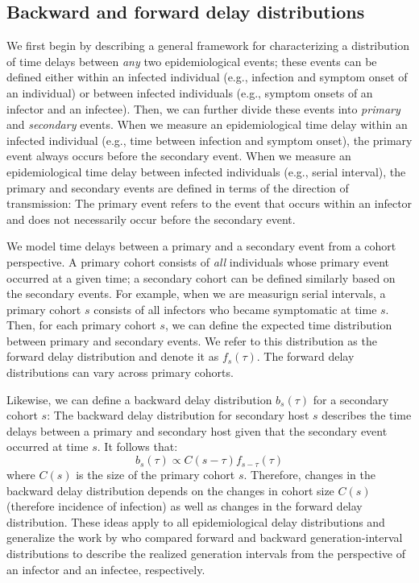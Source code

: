 \documentclass[12pt]{article}
\begin{document}
\subsection{Backward and forward delay distributions}

We first begin by describing a general framework for characterizing a distribution of time delays between \emph{any} two epidemiological events;
these events can be defined either within an infected individual (e.g., infection and symptom onset of an individual) or between infected individuals (e.g., symptom onsets of an infector and an infectee).
Then, we can further divide these events into \emph{primary} and \emph{secondary} events.
When we measure an epidemiological time delay within an infected individual (e.g., time between infection and symptom onset), the primary event always occurs before the secondary event.
When we measure an epidemiological time delay between infected individuals (e.g., serial interval), 
the primary and secondary events are defined in terms of the direction of transmission:
The primary event refers to the event that occurs within an infector and does not necessarily occur before the secondary event.

We model time delays between a primary and a secondary event from a cohort perspective.
A primary cohort consists of \emph{all} individuals whose primary event occurred at a given time; 
a secondary cohort can be defined similarly based on the secondary events.
For example, when we are measurign serial intervals, a primary cohort $s$ consists of all infectors who became symptomatic at time $s$.
Then, for each primary cohort $s$, we can define the expected time distribution between primary and secondary events.
We refer to this distribution as the forward delay distribution and denote it as $f_s(\tau)$.
The forward delay distributions can vary across primary cohorts.

Likewise, we can define a backward delay distribution $b_s(\tau)$ for a secondary cohort $s$:
The backward delay distribution for secondary host $s$ describes the time delays between a primary and secondary host given that the secondary event occurred at time $s$.
It follows that:
\begin{equation}
b_s(\tau) \propto C(s-\tau) f_{s-\tau}(\tau)
\end{equation}
where $C(s)$ is the size of the primary cohort $s$.
Therefore, changes in the backward delay distribution depends on the changes in cohort size $C(s)$ (therefore incidence of infection) as well as changes in the forward delay distribution.
These ideas apply to all epidemiological delay distributions and generalize the work by \citep{champredon2015intrinsic} who compared forward and backward generation-interval distributions to describe the realized generation intervals from the perspective of an infector and an infectee, respectively.
\end{document}
